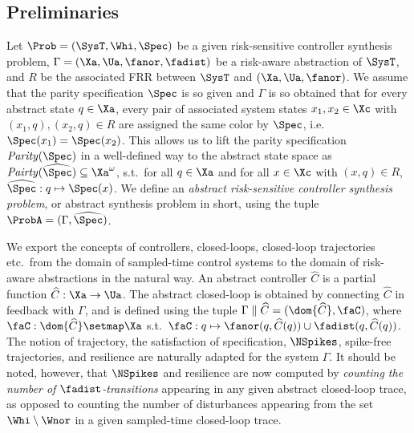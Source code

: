\subsection{Preliminaries}


Let $\Prob=(\SysT,\Whi,\Spec)$ be a given risk-sensitive controller synthesis problem, $\Gamma=(\Xa,\Ua,\fanor,\fadist)$ be a risk-aware abstraction of $\SysT$, and $R$ be the associated FRR between $\SysT$ and $(\Xa,\Ua,\fanor)$.
We assume that the parity specification $\Spec$ is so given and $\Gamma$ is so obtained that for every abstract state $q\in \Xa$, every pair of associated system states $x_1,x_2 \in \Xc$ with $(x_1,q),(x_2,q)\in R$ are assigned the same color by $\Spec$, i.e.\ $\Spec(x_1)=\Spec(x_2)$.
This allows us to lift the parity specification $\mathit{Parity}(\Spec)$ in a well-defined way to the abstract state space as $\mathit{Pairty}(\widehat{\Spec})\subseteq \Xa^\omega$, s.t.\ for all $q\in \Xa$ and for all $x\in \Xc$ with $(x,q)\in R$, $\widehat{\Spec}:q\mapsto \Spec(x)$.
We define an \emph{abstract risk-sensitive controller synthesis problem}, or abstract synthesis problem in short, using the tuple $\ProbA=(\Gamma,\widehat{\Spec})$.

We export the concepts of controllers, closed-loops, closed-loop trajectories etc.\ from the domain of sampled-time control systems to the domain of risk-aware abstractions in the natural way.
An abstract controller $\widehat{C}$ is a partial function $\widehat{C}:\Xa\rightarrow \Ua$.
The abstract closed-loop is obtained by connecting $\widehat{C}$ in feedback with $\Gamma$, and is defined using the tuple $\Gamma\parallel \widehat{C}=(\dom{\widehat{C}}, \faC)$, where $\faC:\dom{\widehat{C}}\setmap \Xa$ s.t.\ $\faC:q\mapsto \fanor(q,\widehat{C}(q))\cup \fadist(q,\widehat{C}(q))$.
The notion of trajectory, the satisfaction of specification, $\NSpikes$, spike-free trajectories, and resilience are naturally adapted for the system $\Gamma$.
It should be noted, however, that $\NSpikes$ and resilience are now computed by \emph{counting the number of $\fadist$-transitions} appearing in any given abstract closed-loop trace, as opposed to counting the number of disturbances appearing from the set $\Whi\setminus\Wnor$ in a given sampled-time closed-loop trace.


